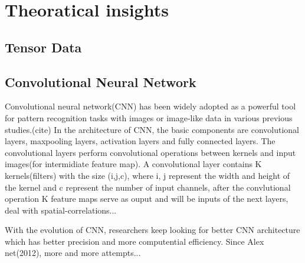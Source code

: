 \chapter{Theoratical insights}

\section{Tensor Data}


\section{Convolutional Neural Network}
Convolutional neural network(CNN) has been widely adopted as a powerful tool for pattern recognition tasks with images or image-like data in various previous studies.(cite) 
In the architecture of CNN, the basic components are convolutional layers, maxpooling layers, activation layers and fully connected layers. The convolutional layers perform convolutional operations between kernels and input images(for intermidiate feature map). A convolutional layer contains K kernels(filters) with the size (i,j,c), where i, j represent the width and height of the kernel and c represent the number of input channels, after the convlutional operation K feature maps serve as ouput and will be inputs of the next layers, deal with spatial-correlations...

With the evolution of CNN, researchers keep looking for better CNN architecture which has better precision and more computential efficiency. Since Alex net(2012), more and more attempts... 

